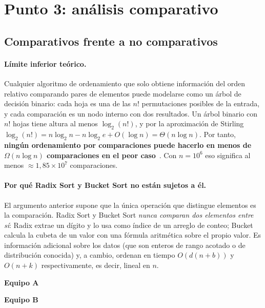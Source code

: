 \documentclass[11pt,a4paper]{article}
\begin{document}
\section{Punto 3: an\'alisis comparativo}\label{sec:p3}

\subsection{Comparativos frente a no comparativos}

\paragraph{L\'imite inferior te\'orico.} Cualquier algoritmo de ordenamiento que solo obtiene informaci\'on del
orden relativo comparando pares de elementos puede modelarse como un \'arbol de decisi\'on binario: cada hoja
es una de las $n!$ permutaciones posibles de la entrada, y cada comparaci\'on es un nodo interno con dos
resultados. Un \'arbol binario con $n!$ hojas tiene altura al menos $\log_2(n!)$, y por la aproximaci\'on de
Stirling $\log_2(n!)=n\log_2 n-n\log_2 e+O(\log n)=\Theta(n\log n)$. Por tanto, \textbf{ning\'un ordenamiento por
comparaciones puede hacerlo en menos de $\Omega(n\log n)$ comparaciones en el peor caso}~\cite{clrs}. Con
$n=10^6$ eso significa al menos $\approx1{,}85\times10^7$ comparaciones.

\paragraph{Por qu\'e Radix Sort y Bucket Sort no est\'an sujetos a \'el.} El argumento anterior supone que la
\'unica operaci\'on que distingue elementos es la comparaci\'on. Radix Sort y Bucket Sort \emph{nunca comparan
dos elementos entre s\'i}: Radix extrae un d\'igito y lo usa como \'indice de un arreglo de conteo; Bucket
calcula la cubeta de un valor con una f\'ormula aritm\'etica sobre el propio valor. Es informaci\'on adicional
sobre los datos (que son enteros de rango acotado o de distribuci\'on conocida) y, a cambio, ordenan en tiempo
$O(d(n+b))$ y $O(n+k)$ respectivamente, es decir, lineal en $n$.

\begin{table}[htbp]
\centering
\caption{Tiempos de ordenamiento con $n=1.000.000$ (entrada aleatoria). Promedio $\pm$ desviaci\'on est\'andar.}\label{tab:q1}
\textbf{Equipo A}\par\smallskip
\medskip
\textbf{Equipo B}\par\smallskip

\end{table}
\end{document}
